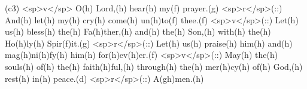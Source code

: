 (c3) <sp>v</sp> O(h) Lord,(h) hear(h) my(f) prayer.(g) <sp>r</sp>(::) And(h) let(h) my(h) cry(h) come(h) un(h)to(f) thee.(f) <sp>v</sp>(::) Let(h) us(h) bless(h) the(h) Fa(h)ther,(h) and(h) the(h) Son,(h) with(h) the(h) Ho(h)ly(h) Spir(f)it.(g) <sp>r</sp>(::) Let(h) us(h) praise(h) him(h) and(h) mag(h)ni(h)fy(h) him(h) for(h)ev(h)er.(f) <sp>v</sp>(::) May(h) the(h) souls(h) of(h) the(h) faith(h)ful,(h) through(h) the(h) mer(h)cy(h) of(h) God,(h) rest(h) in(h) peace.(d) <sp>r</sp>(::) A(gh)men.(h)